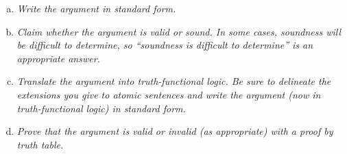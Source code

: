 \documentclass{article}
\begin{document}
\begin{enumerate}[(a)]
      \item \textit{Write the argument in standard form.}
      \item \textit{Claim whether the argument is valid or sound. In some cases, soundness will be difficult to determine, so “soundness is difficult to determine” is an appropriate answer.}
      \item \textit{Translate the argument into truth-functional logic. Be sure to delineate the extensions you give to atomic sentences and write the argument (now in truth-functional logic) in standard form.}
      \item \textit{Prove that the argument is valid or invalid (as appropriate) with a proof by truth table.}
\end{enumerate}
\end{document}
